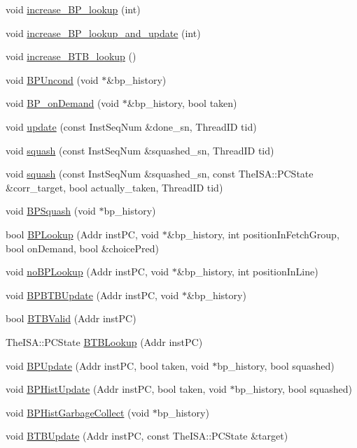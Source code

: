 \begin{DoxyCompactItemize}
\item 
void \hyperlink{classBPredUnit_a89690e897bb5661ee868f659a06515c9}{increase\_\-BP\_\-lookup} (int)
\item 
void \hyperlink{classBPredUnit_a471a1acb994d07a6d57b2f39ce56e6a4}{increase\_\-BP\_\-lookup\_\-and\_\-update} (int)
\item 
void \hyperlink{classBPredUnit_a41ecb08c99f45538eaf1de4e184905b4}{increase\_\-BTB\_\-lookup} ()
\item 
void \hyperlink{classBPredUnit_a24bfe00e5e8c2a318930a6474ed60173}{BPUncond} (void $\ast$\&bp\_\-history)
\item 
void \hyperlink{classBPredUnit_a282f0c689c4cedfb52221c1ce96b4084}{BP\_\-onDemand} (void $\ast$\&bp\_\-history, bool taken)
\item 
void \hyperlink{classBPredUnit_aa154b29fbf52ad49d89a046e94b53ac9}{update} (const InstSeqNum \&done\_\-sn, ThreadID tid)
\item 
void \hyperlink{classBPredUnit_a94a04b4bdf8f6b9b3cf33882bc16067b}{squash} (const InstSeqNum \&squashed\_\-sn, ThreadID tid)
\item 
void \hyperlink{classBPredUnit_a78e6f48f8a11db90daab850527d48aa7}{squash} (const InstSeqNum \&squashed\_\-sn, const TheISA::PCState \&corr\_\-target, bool actually\_\-taken, ThreadID tid)
\item 
void \hyperlink{classBPredUnit_a14a43c5f5bc8c64c07a075ce1608f9c3}{BPSquash} (void $\ast$bp\_\-history)
\item 
bool \hyperlink{classBPredUnit_aafefe8c8d85f49d118e825fa0c1c0176}{BPLookup} (Addr instPC, void $\ast$\&bp\_\-history, int positionInFetchGroup, bool onDemand, bool \&choicePred)
\item 
void \hyperlink{classBPredUnit_af5b3e6db0cf1f00dee290e16765f28f8}{noBPLookup} (Addr instPC, void $\ast$\&bp\_\-history, int positionInLine)
\item 
void \hyperlink{classBPredUnit_a55a6608f958c4e70360c34bd48c57032}{BPBTBUpdate} (Addr instPC, void $\ast$\&bp\_\-history)
\item 
bool \hyperlink{classBPredUnit_a66a1f6f9cdd28b38b005a666a9976ed7}{BTBValid} (Addr instPC)
\item 
TheISA::PCState \hyperlink{classBPredUnit_a31024f2d92bfd7e778a790f4c6f61498}{BTBLookup} (Addr instPC)
\item 
void \hyperlink{classBPredUnit_a35c57ae0661f1d5dd2169e919741d47b}{BPUpdate} (Addr instPC, bool taken, void $\ast$bp\_\-history, bool squashed)
\item 
void \hyperlink{classBPredUnit_a16de9793a28ee07dcf26d89c03328555}{BPHistUpdate} (Addr instPC, bool taken, void $\ast$bp\_\-history, bool squashed)
\item 
void \hyperlink{classBPredUnit_a9268abcbddfdfd6e6a076ecd343a3de5}{BPHistGarbageCollect} (void $\ast$bp\_\-history)
\item 
void \hyperlink{classBPredUnit_a5afe025cde23c608d745e8daca63e8a6}{BTBUpdate} (Addr instPC, const TheISA::PCState \&target)
\end{DoxyCompactItemize}


